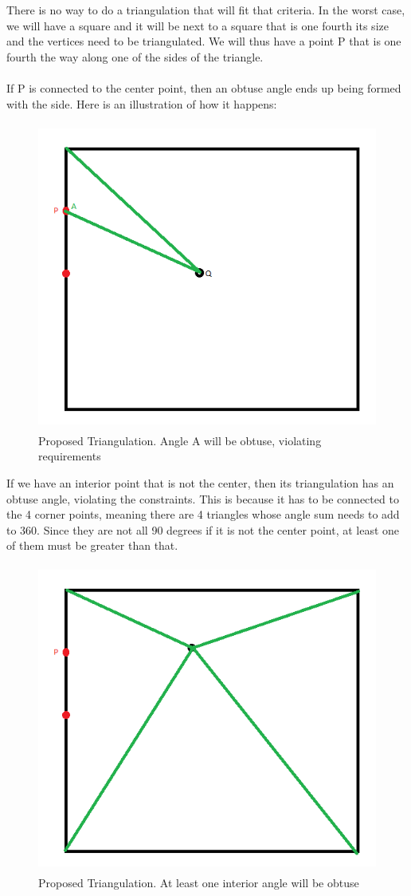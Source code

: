 \documentclass[11pt,psfig]{article}
\begin{document}
There is no way to do a triangulation that will fit that criteria. In the worst case, we will have a square and it will be next to a square that is one fourth its size and the vertices need to be triangulated. We will thus have a point P that is one fourth the way along one of the sides of the triangle. \\
\\
If P is connected to the center point, then an obtuse angle ends up being formed with the side. Here is an illustration of how it happens:
\begin{figure}[H]
\centering
\includegraphics[height=4in]{hw5prob3_diagram1.png}
\caption{Proposed Triangulation. Angle A will be obtuse, violating requirements}
\end{figure}
If we have an interior point that is not the center, then its triangulation has an obtuse angle, violating the constraints. This is because it has to be connected to the 4 corner points, meaning there are 4 triangles whose angle sum needs to add to 360. Since they are not all 90 degrees if it is not the center point, at least one of them must be greater than that.
\begin{figure}[H]
\centering
\includegraphics[height=4in]{hw5prob3_diagram2.png}
\caption{Proposed Triangulation. At least one interior angle will be obtuse}
\end{figure} 
\end{document}
